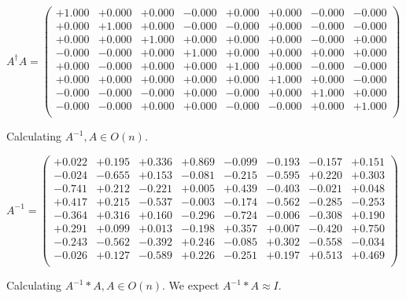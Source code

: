 \documentclass[9pt]{article}
\theoremstyle{plain}
\theoremstyle{definition}
\theoremstyle{remark}
\numberwithin{equation}{section}
\begin{document}
$A^{\dag} A = \left(
\begin{array}{
cccccccc}
+1.000 & +0.000 & +0.000 & -0.000 & +0.000 & +0.000 & -0.000 & -0.000 \\
+0.000 & +1.000 & +0.000 & -0.000 & -0.000 & +0.000 & -0.000 & -0.000 \\
+0.000 & +0.000 & +1.000 & +0.000 & +0.000 & +0.000 & -0.000 & +0.000 \\
-0.000 & -0.000 & +0.000 & +1.000 & +0.000 & +0.000 & +0.000 & +0.000 \\
+0.000 & -0.000 & +0.000 & +0.000 & +1.000 & +0.000 & -0.000 & -0.000 \\
+0.000 & +0.000 & +0.000 & +0.000 & +0.000 & +1.000 & +0.000 & -0.000 \\
-0.000 & -0.000 & -0.000 & +0.000 & -0.000 & +0.000 & +1.000 & +0.000 \\
-0.000 & -0.000 & +0.000 & +0.000 & -0.000 & -0.000 & +0.000 & +1.000 \\
\end{array}
\right)$ \newline 

Calculating $A^{-1} ,  A \in O(n)$.

$A^{-1} = \left(
\begin{array}{
cccccccc}
+0.022 & +0.195 & +0.336 & +0.869 & -0.099 & -0.193 & -0.157 & +0.151 \\
-0.024 & -0.655 & +0.153 & -0.081 & -0.215 & -0.595 & +0.220 & +0.303 \\
-0.741 & +0.212 & -0.221 & +0.005 & +0.439 & -0.403 & -0.021 & +0.048 \\
+0.417 & +0.215 & -0.537 & -0.003 & -0.174 & -0.562 & -0.285 & -0.253 \\
-0.364 & +0.316 & +0.160 & -0.296 & -0.724 & -0.006 & -0.308 & +0.190 \\
+0.291 & +0.099 & +0.013 & -0.198 & +0.357 & +0.007 & -0.420 & +0.750 \\
-0.243 & -0.562 & -0.392 & +0.246 & -0.085 & +0.302 & -0.558 & -0.034 \\
-0.026 & +0.127 & -0.589 & +0.226 & -0.251 & +0.197 & +0.513 & +0.469 \\
\end{array}
\right)$ \newline 

Calculating $A^{-1} *A  ,  A \in O(n)$.   We expect $A^{-1} *A  \approx I$. 
\end{document}
